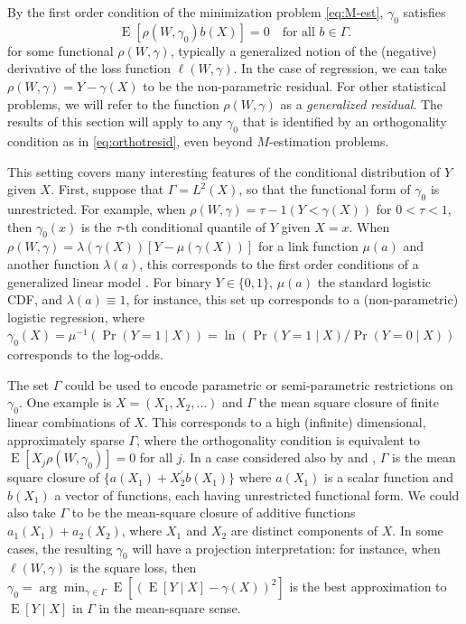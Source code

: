 \documentclass[aos]{imsart}
\numberwithin{equation}{section}
\theoremstyle{plain}
\theoremstyle{remark}
\DeclareMathOperator{\E}{E}
\begin{document}
By the first order condition of the minimization problem \eqref{eq:M-est}, $\gamma_0$ satisfies
\begin{equation}
\label{eq:orthotresid}
\E[\rho(W,\gamma_{0})b(X)]=0 \quad \text{for all } b\in\Gamma.
\end{equation}
for some functional $\rho(W, \gamma)$, typically a generalized notion of the (negative) derivative of the loss function $\ell(W, \gamma)$. In the case of regression, we can take $\rho(W, \gamma) = Y - \gamma(X)$ to be the non-parametric residual. For other statistical problems, we will refer to the function $\rho(W, \gamma)$ as a \textit{generalized residual}. The results of this section will apply to any $\gamma_0$ that is identified by an orthogonality condition as in \eqref{eq:orthotresid}, even beyond $M$-estimation problems.

This setting covers many interesting features of the conditional distribution of $Y$ given $X$. First, suppose that $\Gamma = L^2(X)$, so that the functional form of $\gamma_0$ is unrestricted. For example, when $\rho(W ,\gamma) = \tau - 1(Y < \gamma(X))$ for $0 < \tau < 1$, then $\gamma_0(x)$ is the $\tau$-th conditional quantile of $Y$ given $X = x$. When $\rho(W,\gamma)=\lambda(\gamma(X))[Y-\mu(\gamma(X))]$ for a link function $\mu(a)$ and another function $\lambda(a)$, this corresponds to the first order conditions of a generalized linear model \citep{nelder1972generalized}. For binary $Y \in \{0, 1\}$, $\mu(a)$ the standard logistic CDF, and $\lambda(a) \equiv 1$, for instance, this set up corresponds to a (non-parametric) logistic regression, where $\gamma_0(X) = \mu^{-1}(\Pr(Y = 1 \mid X)) = \ln (\Pr(Y = 1 \mid X)/ \Pr(Y = 0 \mid X))$ corresponds to the log-odds.

The set $\Gamma$ could be used to encode parametric or semi-parametric restrictions on $\gamma_0$. One example is $X=(X_{1},X_{2},...)$ and $\Gamma$ the mean square closure of finite linear combinations of $X$. This corresponds to a high (infinite) dimensional, approximately sparse $\Gamma$, where the orthogonality condition is equivalent to $\E[X_{j} \rho(W,\gamma_{0})]=0$ for all $j$. In a case considered also by \cite{hirshberg2021augmented} and \cite{farrell2021deep}, $\Gamma$ is the mean square closure of $\{a(X_{1})+X_{2}^{\prime}b(X_{1})\}$ where $a(X_{1})$ is a scalar function and $b(X_{1})$ a vector of functions, each having unrestricted functional form. We could also take $\Gamma$ to be the mean-square closure of additive functions $a_{1}(X_{1})+a_{2}(X_{2})$, where $X_{1}\,\ $and $X_{2}$ are distinct components of $X$. In some cases, the resulting $\gamma_0$ will have a projection interpretation: for instance, when $\ell(W, \gamma)$ is the square loss, then $\gamma_0 = \arg\min_{\gamma \in \Gamma} \E[(\E[Y \mid X] - \gamma(X))^2]$ is the best approximation to $\E[Y \mid X]$ in $\Gamma$ in the mean-square sense.
\end{document}
